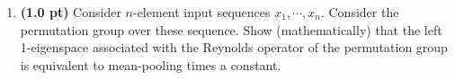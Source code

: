 \documentclass{article}
\begin{document}
%
\begin{enumerate}




%

%




%
\item {\bf (1.0 pt)} Consider $n$-element input sequences $x_{1}, \cdots,
x_{n}$.
%
Consider the permutation group over these sequence.
%
Show (mathematically) that the left 1-eigenspace associated with the Reynolds operator of the
permutation group is equivalent to mean-pooling times a constant.

%

%
\vfill





\end{enumerate}
\end{document}
